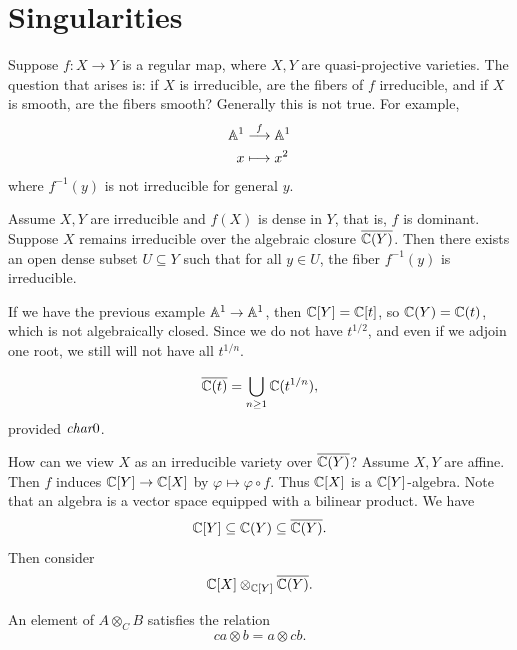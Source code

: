 
\section{Singularities}

Suppose $f : X\to Y$ is a regular map, where $X,Y$ are quasi-projective varieties.
The question that arises is: if $X$ is irreducible, are the fibers of $f$ irreducible, and if $X$ is smooth, are the fibers smooth?
Generally this is not true.
For example,
\begin{align*}
    \aa^1 &\overset{f}{\longrightarrow} \aa^1 \\
    x &\longmapsto x^2
\end{align*}
where $f^{-1}(y)$ is not irreducible for general $y$.

\begin{theorem*}{
    Assume $X,Y$ are irreducible and $f(X)$ is dense in $Y$, that is, $f$ is dominant.
    Suppose $X$ remains irreducible over the algebraic closure $\overline{\c(Y)}$.
    Then there exists an open dense subset $U\subseteq Y$ such that for all $y\in U$, the fiber $f^{-1}(y)$ is irreducible.
}
\end{theorem*}

If we have the previous example $\aa^1\to \aa^1$, then $\c[Y] = \c[t]$, so $\c(Y) = \c(t)$, which is not algebraically closed.
Since we do not have $t^{1/2}$, and even if we adjoin one root, we still will not have all $t^{1/n}$.

\begin{theorem*}{
    \[
        \overline{\c(t)} = \bigcup_{n\geq 1}\c\bigl(t^{1/n}\bigr),
    \]
    provided $\char 0$.
}
\end{theorem*}

How can we view $X$ as an irreducible variety over $\overline{\c(Y)}$?
Assume $X,Y$ are affine.
Then $f$ induces $\c[Y]\to \c[X]$ by $\varphi \mapsto \varphi\circ f$.
Thus $\c[X]$ is a $\c[Y]$-algebra.
Note that an algebra is a vector space equipped with a bilinear product.
We have
\[
    \c[Y]\subseteq \c(Y)\subseteq \overline{\c(Y)}.
\]
Then consider
\[
    \c[X]\otimes_{\c[Y]}\overline{\c(Y)}.
\]

\begin{definition}
    An element of $A\otimes_C B$ satisfies the relation
    \[
        ca\otimes b = a\otimes cb.
    \]
\end{definition}

